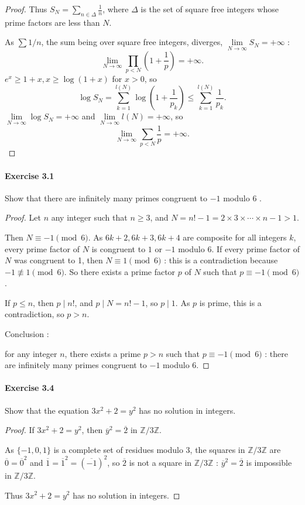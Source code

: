 \documentclass{article}
\begin{document}
\begin{proof}
Thus $S_N = \sum_{n\in \Delta} \frac{1}{n}$, where $\Delta$ is the set of square free integers whose prime factors are less than $N$.

As $\sum 1/n$, the sum being over square free integers, diverges, $\lim\limits_{N\to \infty} S_N = + \infty$ :
$$\lim_{N \to \infty} \prod_{p<N} \left(1+\frac{1}{p}\right) = +\infty.$$
 $e^x \geq 1+x, x \geq \log (1+x)$ for $x>0$, so
$$\log S_N = \sum_{k=1}^{l(N)} \log\left(1+\frac{1}{p_k}\right) \leq \sum_{k=1}^{l(N)} \frac{1}{p_k}.$$
$\lim\limits_{N\to \infty} \log S_N = +\infty$ and $\lim\limits_{N\to \infty} l(N) = +\infty$, so
$$\lim_{N\to \infty} \sum_{p<N} \frac{1}{p} = +\infty.$$
\end{proof}



\paragraph{Exercise 3.1} Show that there are infinitely many primes congruent to $-1$ modulo 6 .
\begin{proof}    
Let $n$ any integer such that $n\geq 3$, and $N = n! -1 =   2 \times 3 \times\cdots\times n - 1 >1$. 

Then $N \equiv -1 \pmod 6$. As $6k +2, 6k +3, 6k +4$ are composite for all integers $k$, every prime factor of $N$ is congruent to $1$ or $-1$ modulo $6$.  If every prime factor of $N$ was congruent to 1, then $N \equiv 1 \pmod 6$ : this is a contradiction because $-1 \not \equiv 1 \pmod 6$.  So there exists a prime factor $p$ of $N$ such that $p\equiv -1 \pmod 6$.

If $p\leq n$, then $p \mid n!$, and $p \mid N = n!-1$, so $p \mid 1$. As $p$ is prime, this is a contradiction, so $p>n$. 

Conclusion :

 for any integer $n$, there exists a prime $p >n$ such that $p \equiv -1 \pmod 6$ : there are infinitely many primes congruent to $-1$ modulo $6$.
\end{proof}



\paragraph{Exercise 3.4} Show that the equation $3 x^{2}+2=y^{2}$ has no solution in integers.
\begin{proof}    
If $3x^2+2 = y^2$, then  $\overline{y}^2 = \overline{2}$ in $\mathbb{Z}/3\mathbb{Z}$.


As $\{-1,0,1\}$ is a complete set of residues modulo $3$, the squares in $\mathbb{Z}/3\mathbb{Z}$ are $\overline{0} = \overline{0}^2$ and  $\overline{1} = \overline{1}^2 = (\overline{-1})^2$, so $\overline{2}$ is not a square in $\mathbb{Z}/3\mathbb{Z}$ : $\overline{y}^2 = \overline{2}$ is impossible in $\mathbb{Z}/3\mathbb{Z}$.

Thus $3x^2+2 = y^2$ has no solution in integers.
\end{proof}
\end{document}
